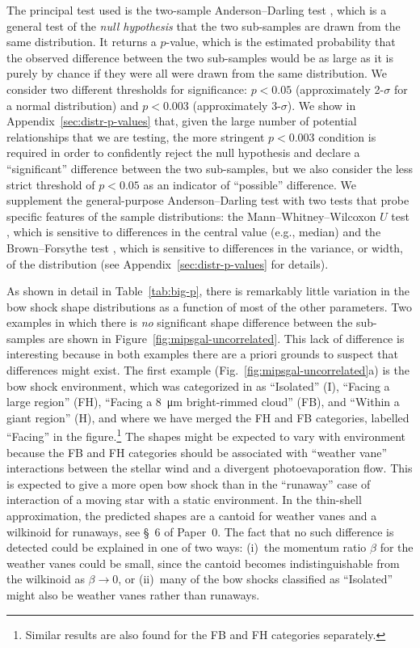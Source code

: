 The principal test used is the two-sample Anderson--Darling test
\citep{Anderson:1952a, Scholz:1987a, Makarov:2017a}, which is a
general test of the \textit{null hypothesis} that the two sub-samples
are drawn from the same distribution.  It returns a \(p\)-value, which
is the estimated probability that the observed difference between the
two sub-samples would be as large as it is purely by chance if they
were all were drawn from the same distribution.  We consider two
different thresholds for significance: \(p < 0.05\) (approximately
2-\(\sigma\) for a normal distribution) and \(p < 0.003\) (approximately
3-\(\sigma\)).  We show in Appendix~\ref{sec:distr-p-values} that, given
the large number of potential relationships that we are testing, the
more stringent \(p < 0.003\) condition is required in order to
confidently reject the null hypothesis and declare a ``significant''
difference between the two sub-samples, but we also consider the less
strict threshold of \(p < 0.05\) as an indicator of ``possible''
difference.  We supplement the general-purpose Anderson--Darling test
with two tests that probe specific features of the sample
distributions: the Mann--Whitney--Wilcoxon \(U\) test
\citep{Mann:1947a}, which is sensitive to differences in the central
value (e.g., median) and the Brown--Forsythe test \citep{Brown:1974a},
which is sensitive to differences in the variance, or width, of the
distribution (see Appendix~\ref{sec:distr-p-values} for details).
  
As shown in detail in Table~\ref{tab:big-p}, there is remarkably
little variation in the bow shock shape distributions as a function of
most of the other parameters.  Two examples in which there is
\textit{no} significant shape difference between the sub-samples are
shown in Figure~\ref{fig:mipsgal-uncorrelated}.  This lack of
difference is interesting because in both examples there are a priori
grounds to suspect that differences might exist.  The first example
(Fig.~\ref{fig:mipsgal-uncorrelated}a) is the bow shock environment,
which was categorized in \citet{Kobulnicky:2016a} as ``Isolated'' (I),
``Facing a large \hii{} region'' (FH), ``Facing a \SI{8}{\um}
bright-rimmed cloud'' (FB), and ``Within a giant \hii{} region'' (H),
and where we have merged the FH and FB categories, labelled ``Facing''
in the figure.\footnote{Similar results are also found for the FB and
  FH categories separately.}  The shapes might be expected to vary
with environment because the FB and FH categories should be associated
with ``weather vane'' interactions \citep{Povich:2008a} between the
stellar wind and a divergent photoevaporation flow.  This is expected
to give a more open bow shock than in the ``runaway'' case of
interaction of a moving star with a static environment.  In the
thin-shell approximation, the predicted shapes are a cantoid for
weather vanes and a wilkinoid for runaways, see \S~6 of Paper~0.  The
fact that no such difference is detected could be explained in one of
two ways: (i)~the momentum ratio \(\beta\) for the weather vanes could be
small, since the cantoid becomes indistinguishable from the wilkinoid
as \(\beta \to 0\), or (ii)~many of the bow shocks classified as
``Isolated'' might also be weather vanes rather than runaways.

